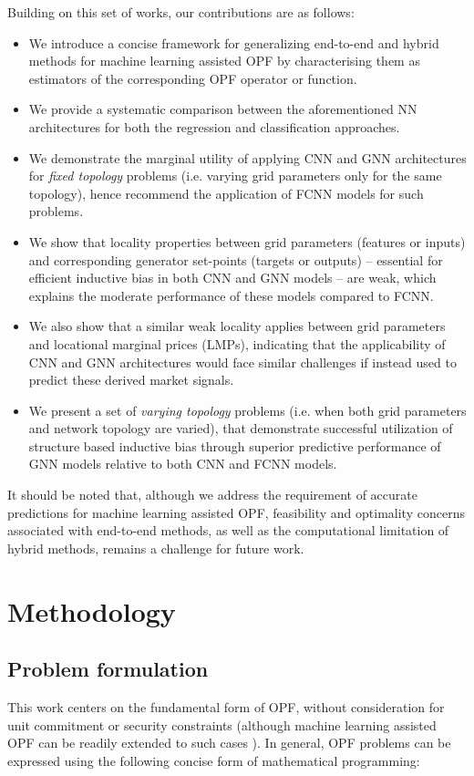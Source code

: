 \documentclass[journal]{IEEEtran}
\begin{document}
Building on this set of works, our contributions are as follows: 
\begin{itemize}
    \item We introduce a concise framework for generalizing end-to-end and hybrid methods for machine learning assisted OPF by characterising them as estimators of the corresponding OPF operator or function.
    \item We provide a systematic comparison between the aforementioned NN architectures for both the regression and classification approaches.
    \item We demonstrate the marginal utility of applying CNN and GNN architectures for \emph{fixed topology} problems (i.e. varying grid parameters only for the same topology), hence recommend the application of FCNN models for such problems.
    \item We show that locality properties between grid parameters (features or inputs) and corresponding generator set-points (targets or outputs) -- essential for efficient inductive bias in both CNN and GNN models -- are weak, which explains the moderate performance of these models compared to FCNN.
    \item We also show that a similar weak locality applies between grid parameters and locational marginal prices (LMPs), indicating that the applicability of CNN and GNN architectures would face similar challenges if instead used to predict these derived market signals.
    \item We present a set of \emph{varying topology} problems (i.e. when both grid parameters and network topology are varied), that demonstrate successful utilization of structure based inductive bias through superior predictive performance of GNN models relative to both CNN and FCNN models.
\end{itemize}

It should be noted that, although we address the requirement of accurate predictions for machine learning assisted OPF, feasibility and optimality concerns associated with end-to-end methods, as well as the computational limitation of hybrid methods, remains a challenge for future work.

\section{Methodology}

\subsection{Problem formulation}
This work centers on the fundamental form of OPF, without consideration for unit commitment or security constraints (although machine learning assisted OPF can be readily extended to such cases \cite{Halilbasic2018, Pan2020}).
In general, OPF problems can be expressed using the following concise form of mathematical programming:
\end{document}
